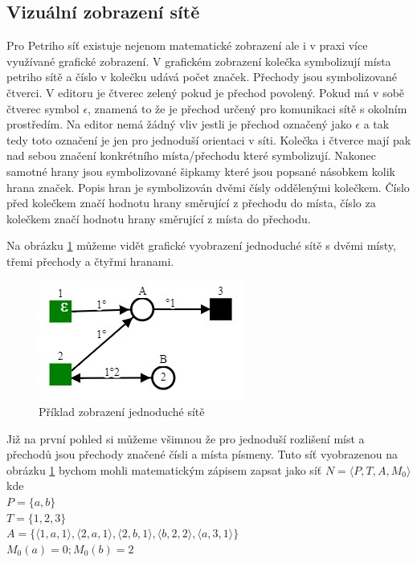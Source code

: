\documentclass[
  biblatex,
  glossaries,
  index
]{kidiplom}
\begin{document}
\subsection{Vizuální zobrazení sítě}

Pro Petriho síť existuje nejenom matematické zobrazení ale i
v praxi více využívané grafické zobrazení. 
V grafickém zobrazení kolečka symbolizují místa petriho sítě
a číslo v kolečku udává počet značek. 
Přechody jsou symbolizované 
čtverci. V editoru je čtverec zelený pokud je přechod povolený.
Pokud má v sobě čtverec symbol $\epsilon$, znamená to že je 
přechod určený pro komunikaci sítě s okolním prostředím.
Na editor nemá žádný vliv jestli je přechod označený jako $\epsilon$
a tak tedy toto označení je jen pro jednoduší orientaci v síti.
Kolečka i čtverce mají pak nad sebou značení 
konkrétního místa/přechodu které symbolizují. 
Nakonec samotné hrany jsou symbolizované šipkamy které jsou 
popsané násobkem kolik hrana  značek.
Popis hran je symbolizován dvěmi čísly oddělenými kolečkem.
Číslo před kolečkem značí hodnotu hrany směrující z přechodu 
do místa, číslo za kolečkem značí hodnotu hrany směrující z 
místa do přechodu.

Na obrázku \ref{fig:jednoduchá síť zobrazení} můžeme vidět grafické 
vyobrazení jednoduché sítě s dvěmi místy, třemi přechody a čtyřmi hranami.
\begin{figure}[h]
  \centering
  \includegraphics{simple_net}
  \caption[síť]{Příklad zobrazení jednoduché sítě}\label{fig:jednoduchá síť zobrazení}
\end{figure}
Již na první pohled si můžeme všimnou že pro jednoduší rozlišení 
míst a přechodů jsou přechody značené čísli a místa písmeny.
Tuto síť vyobrazenou na obrázku \ref{fig:jednoduchá síť zobrazení} 
bychom mohli matematickým zápisem zapsat jako síť 
$ N = \langle P,T,A,M_{0}\rangle $
kde \\
$P = \{a,b\}$ \\
$T = \{1,2,3\}$ \\
$A = \{
  \langle 1,a,1 \rangle,
  \langle 2,a,1 \rangle,
  \langle 2,b,1 \rangle,
  \langle b,2,2 \rangle,
  \langle a,3,1 \rangle
\}$ \\
$M_{0}(a) = 0; M_{0}(b) = 2$
\end{document}
